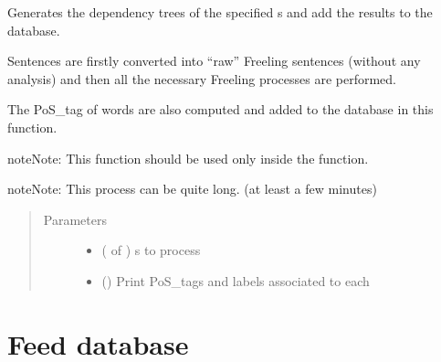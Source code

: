 \documentclass[letterpaper,10pt,english]{sphinxmanual}
\begin{document}
\begin{fulllineitems}
\label{\detokenize{index:loacore.process.deptree_process.add_dep_tree_from_sentences}}
Generates the dependency trees of the specified  s and add the results to the
database.

Sentences are firstly converted into “raw” Freeling sentences (without any analysis) and then all the necessary
Freeling processes are performed.

The PoS\_tag of words are also computed and added to the database in this function.

\begin{sphinxadmonition}{note}{Note:}
This function should be used only inside the  function.
\end{sphinxadmonition}

\begin{sphinxadmonition}{note}{Note:}
This process can be quite long. (at least a few minutes)
\end{sphinxadmonition}
\begin{quote}\begin{description}
\item[{Parameters}] \leavevmode\begin{itemize}
\item {} 
 ( of ) \textendash{}  s to process

\item {} 
 () \textendash{} Print PoS\_tags and labels associated to each 

\end{itemize}

\end{description}\end{quote}

\end{fulllineitems}



\section{Feed database}
\label{\detokenize{index:module-loacore.process.file_process}}\label{\detokenize{index:feed-database}}
\end{document}

